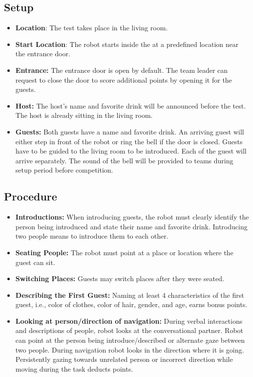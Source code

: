 \subsection*{Setup}
\begin{itemize}
	\item \textbf{Location}: The test takes place in the living room.
	
	\item \textbf{Start Location}: The robot starts inside the \Arena{} at a predefined location near the entrance door.
	
	\item \textbf{Entrance:} The entrance door is open by default. The team leader can request to close the door to score additional points by opening it for the guests.

	\item \textbf{Host:} The host's name and favorite drink will be announced before the test. The host is already sitting in the living room.

	\item \textbf{Guests:} Both guests have a name and favorite drink. An arriving guest will either step in front of the robot or ring the bell if the door is closed. Guests have to be guided to the living room to be introduced. Each of the guest will arrive separately. The sound of the bell will be provided to teams
	during setup period before competition.

\end{itemize}

\subsection*{Procedure}
\begin{itemize}
    \item \textbf{Introductions:} When introducing guests, the robot must clearly identify the person being introduced and state their name and favorite drink. Introducing two people means to introduce them to each other.
	
	\item \textbf{Seating People:} The robot must point at a place or location where the guest can sit.
	
	\item \textbf{Switching Places:} Guests may switch places after they were seated.
	
	\item \textbf{Describing the First Guest:} Naming at least 4 characteristics of the first guest, i.e., color of clothes, color of hair, gender, and age, earns bonus points.
	\item \textbf{Looking at person/direction of navigation:} During verbal interactions and descriptions of people, robot 
	looks at the conversational partner. Robot can point at the person being introduce/described or alternate gaze between two people. During navigation robot looks in the direction where it is going. Persistently gazing towards unrelated 
	person or incorrect direction while moving during the task deducts points. 
\end{itemize}

